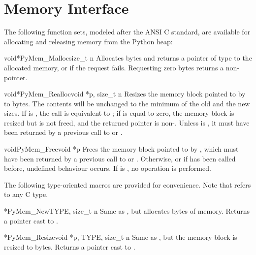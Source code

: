 \documentclass{manual}
\begin{document}
\section{Memory Interface \label{memoryInterface}}

The following function sets, modeled after the ANSI C standard, are
available for allocating and releasing memory from the Python heap:


\begin{cfuncdesc}{void*}{PyMem_Malloc}{size_t n}
Allocates  bytes and returns a pointer of type  to
the allocated memory, or \NULL{} if the request fails. Requesting zero
bytes returns a non-\NULL{} pointer.
\end{cfuncdesc}

\begin{cfuncdesc}{void*}{PyMem_Realloc}{void *p, size_t n}
Resizes the memory block pointed to by  to  bytes. The
contents will be unchanged to the minimum of the old and the new
sizes. If  is \NULL{}, the call is equivalent to
; if  is equal to zero, the memory block
is resized but is not freed, and the returned pointer is non-\NULL{}.
Unless  is \NULL{}, it must have been returned by a previous
call to  or .
\end{cfuncdesc}

\begin{cfuncdesc}{void}{PyMem_Free}{void *p}
Frees the memory block pointed to by , which must have been
returned by a previous call to  or
.  Otherwise, or if
 has been called before, undefined behaviour
occurs. If  is \NULL{}, no operation is performed.
\end{cfuncdesc}

The following type-oriented macros are provided for convenience.  Note 
that  refers to any C type.

\begin{cfuncdesc}{*}{PyMem_New}{TYPE, size_t n}
Same as , but allocates  bytes of memory.  Returns a pointer cast to
.
\end{cfuncdesc}

\begin{cfuncdesc}{*}{PyMem_Resize}{void *p, TYPE, size_t n}
Same as , but the memory block is resized
to  bytes.  Returns a pointer
cast to .
\end{cfuncdesc}
\end{document}
